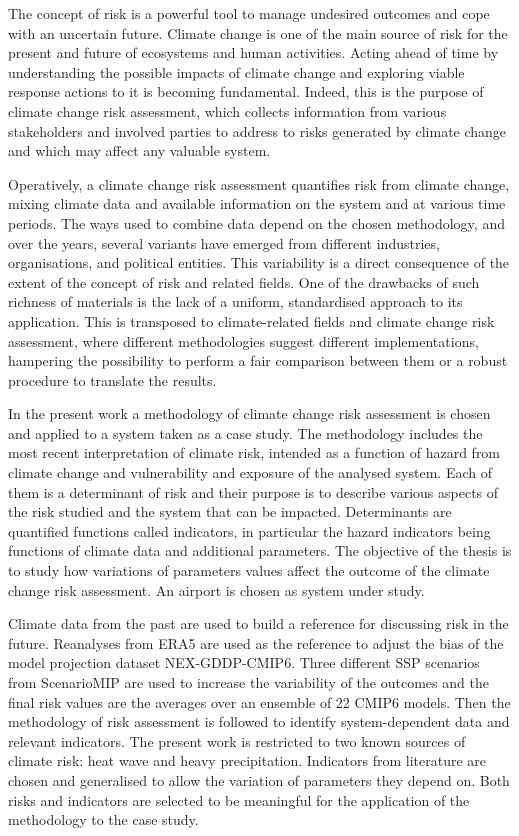 The concept of risk is a powerful tool to manage undesired outcomes and cope with an uncertain future. Climate change is one of the main source of risk for the present and future of ecosystems and human activities. Acting ahead of time by understanding the possible impacts of climate change and exploring viable response actions to it is becoming fundamental.
Indeed, this is the purpose of climate change risk assessment, which collects information from various stakeholders and involved parties to address to risks generated by climate change and which may affect any valuable system.

Operatively, a climate change risk assessment quantifies risk from climate change, mixing climate data and available information on the system and at various time periods. The ways used to combine data depend on the chosen methodology, and over the years, several variants have emerged from different industries, organisations, and political entities. This variability is a direct consequence of the extent of the concept of risk and related fields. One of the drawbacks of such richness of materials is the lack of a uniform, standardised approach to its application. This is transposed to climate-related fields and climate change risk assessment, where different methodologies suggest different implementations, hampering the possibility to perform a fair comparison between them or a robust procedure to translate the results.

In the present work a methodology of climate change risk assessment is chosen and applied to a system taken as a case study. The methodology includes the most recent interpretation of climate risk, intended as a function of hazard from climate change and vulnerability and exposure of the analysed system. Each of them is a determinant of risk and their purpose is to describe various aspects of the risk studied and the system that can be impacted. Determinants are quantified functions called indicators, in particular the hazard indicators being functions of climate data and additional parameters.
The objective of the thesis is to study how variations of parameters values affect the outcome of the climate change risk assessment. An airport is chosen as system under study.

Climate data from the past are used to build a reference for discussing risk in the future. Reanalyses from ERA5 are used as the reference to adjust the bias of the model projection dataset NEX-GDDP-CMIP6. Three different SSP scenarios from ScenarioMIP are used to increase the variability of the outcomes and the final risk values are the averages over an ensemble of 22 CMIP6 models.
Then the methodology of risk assessment is followed to identify system-dependent data and relevant indicators. The present work is restricted to two known sources of climate risk: heat wave and heavy precipitation. Indicators from literature are chosen and generalised to allow the variation of parameters they depend on. Both risks and indicators are selected to be meaningful for the application of the methodology to the case study.

